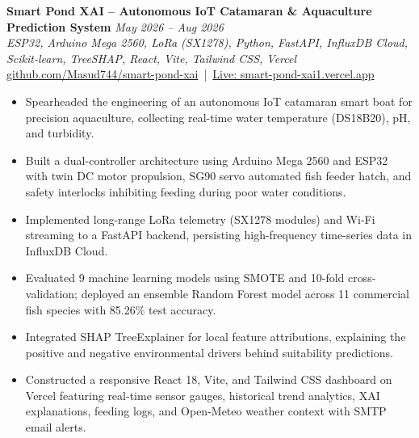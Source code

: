 \documentclass[11pt,a4paper]{article}
\begin{document}
\textbf{Smart Pond XAI -- Autonomous IoT Catamaran \& Aquaculture Prediction System} \hfill \textit{May 2026 -- Aug 2026} \\
\textit{ESP32, Arduino Mega 2560, LoRa (SX1278), Python, FastAPI, InfluxDB Cloud, Scikit-learn, TreeSHAP, React, Vite, Tailwind CSS, Vercel} \\
\href{https://github.com/Masud744/smart-pond-xai}{github.com/Masud744/smart-pond-xai} \,|\, \href{https://smart-pond-xai1.vercel.app/}{Live: smart-pond-xai1.vercel.app}
\begin{itemize}
    \item Spearheaded the engineering of an autonomous IoT catamaran smart boat for precision aquaculture, collecting real-time water temperature (DS18B20), pH, and turbidity.
    \item Built a dual-controller architecture using Arduino Mega 2560 and ESP32 with twin DC motor propulsion, SG90 servo automated fish feeder hatch, and safety interlocks inhibiting feeding during poor water conditions.
    \item Implemented long-range LoRa telemetry (SX1278 modules) and Wi-Fi streaming to a FastAPI backend, persisting high-frequency time-series data in InfluxDB Cloud.
    \item Evaluated 9 machine learning models using SMOTE and 10-fold cross-validation; deployed an ensemble Random Forest model across 11 commercial fish species with 85.26\% test accuracy.
    \item Integrated SHAP TreeExplainer for local feature attributions, explaining the positive and negative environmental drivers behind suitability predictions.
    \item Constructed a responsive React 18, Vite, and Tailwind CSS dashboard on Vercel featuring real-time sensor gauges, historical trend analytics, XAI explanations, feeding logs, and Open-Meteo weather context with SMTP email alerts.
\end{itemize}
\end{document}
